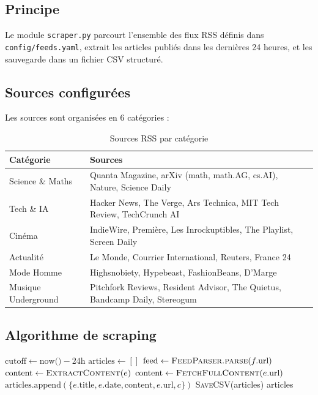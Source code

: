 \documentclass[11pt, a4paper]{article}
\begin{document}
\subsection{Principe}

Le module \texttt{scraper.py} parcourt l'ensemble des flux RSS définis dans \texttt{config/feeds.yaml}, extrait les articles publiés dans les dernières 24 heures, et les sauvegarde dans un fichier CSV structuré.

\subsection{Sources configurées}

Les sources sont organisées en 6 catégories :

\begin{table}[h]
\centering
\small
\begin{tabular}{p{3.5cm}p{9cm}}
\toprule
\textbf{Catégorie} & \textbf{Sources} \\
\midrule
Science \& Maths & Quanta Magazine, arXiv (math, math.AG, cs.AI), Nature, Science Daily \\
Tech \& IA & Hacker News, The Verge, Ars Technica, MIT Tech Review, TechCrunch AI \\
Cinéma & IndieWire, Première, Les Inrockuptibles, The Playlist, Screen Daily \\
Actualité & Le Monde, Courrier International, Reuters, France 24 \\
Mode Homme & Highsnobiety, Hypebeast, FashionBeans, D'Marge \\
Musique Underground & Pitchfork Reviews, Resident Advisor, The Quietus, Bandcamp Daily, Stereogum \\
\bottomrule
\end{tabular}
\caption{Sources RSS par catégorie}
\end{table}

\subsection{Algorithme de scraping}

\begin{algorithm}[H]
\caption{Scraping RSS}
\begin{algorithmic}[1]
\State $\text{cutoff} \gets \text{now()} - 24\text{h}$
\State $\text{articles} \gets []$
        \State $\text{feed} \gets \textsc{FeedParser.parse}(f.\text{url})$
                \State $\text{content} \gets \textsc{ExtractContent}(e)$
                    \State $\text{content} \gets \textsc{FetchFullContent}(e.\text{url})$
                \EndIf
                \State $\text{articles.append}(\{e.\text{title}, e.\text{date}, \text{content}, e.\text{url}, c\})$
            \EndIf
        \EndFor
    \EndFor
\EndFor
\State \textsc{SaveCSV}(articles)
\Return articles
\end{algorithmic}
\end{algorithm}
\end{document}
